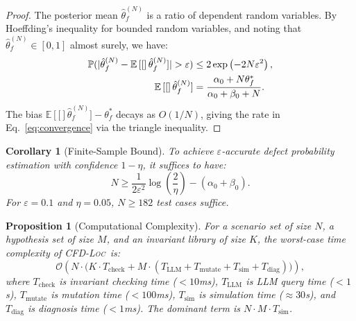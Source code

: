 \documentclass[journal]{IEEEtran}
\theoremstyle{plain}
\newtheorem{corollary}{Corollary}[section]
\newtheorem{proposition}{Proposition}[section]
\theoremstyle{definition}
\theoremstyle{remark}
\newcommand{\methodname}{\textsc{CFD-Loc}}
\newcommand{\E}[1]{\mathbb{E}\left[#1\right]}
\newcommand{\Prob}{\mathbb{P}}
\begin{document}
\begin{proof}
The posterior mean $\hat{\theta}_f^{(N)}$ is a ratio of dependent random variables. By Hoeffding's inequality for bounded random variables, and noting that $\hat{\theta}_f^{(N)} \in [0,1]$ almost surely, we have:
\begin{align}
\Prob(|\hat{\theta}_f^{(N)} - \E[\hat{\theta}_f^{(N)}]| > \varepsilon)
&\leq 2\exp\left(-2N\varepsilon^2\right), \notag \\
\E[\hat{\theta}_f^{(N)}] &= \frac{\alpha_0 + N\theta_f^*}{\alpha_0 + \beta_0 + N}.
\end{align}
The bias $\E[\hat{\theta}_f^{(N)}] - \theta_f^*$ decays as $O(1/N)$, giving the rate in Eq.~\ref{eq:convergence} via the triangle inequality.
\end{proof}

\begin{corollary}[Finite-Sample Bound]\label{cor:sample}
To achieve $\varepsilon$-accurate defect probability estimation with confidence $1-\eta$, it suffices to have:
\begin{equation}
N \geq \frac{1}{2\varepsilon^2} \log\left(\frac{2}{\eta}\right) - (\alpha_0 + \beta_0).
\label{eq:sample_bound}
\end{equation}
For $\varepsilon = 0.1$ and $\eta = 0.05$, $N \geq 182$ test cases suffice.
\end{corollary}

\begin{proposition}[Computational Complexity]\label{prop:complexity}
For a scenario set of size $N$, a hypothesis set of size $M$, and an invariant library of size $K$, the worst-case time complexity of \methodname\ is:
\begin{equation}
\mathcal{O}\left(N \cdot \big( K \cdot T_{\text{check}} + M \cdot (T_{\text{LLM}} + T_{\text{mutate}} + T_{\text{sim}} + T_{\text{diag}}) \big) \right),
\label{eq:complexity}
\end{equation}
where $T_{\text{check}}$ is invariant checking time ($<10$ms), $T_{\text{LLM}}$ is LLM query time ($<1$s), $T_{\text{mutate}}$ is mutation time ($<100$ms), $T_{\text{sim}}$ is simulation time ($\approx 30$s), and $T_{\text{diag}}$ is diagnosis time ($<1$ms). The dominant term is $N \cdot M \cdot T_{\text{sim}}$.
\end{proposition}
\end{document}
